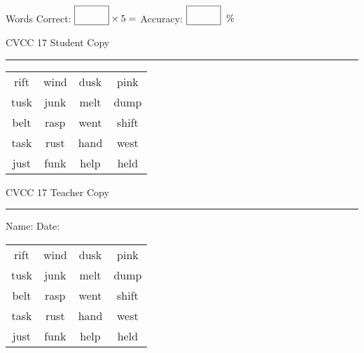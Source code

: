 \documentclass{memoir}
\begin{document}
\small

Words Correct: $\fbox{\phantom{\huge 100}} \times 5 = $ Accuracy: $\fbox{\phantom{\huge 100}}\;\; \%$ 

\vfill

\newpage


\footnotesize \noindent
CVCC 17 \hfill Student Copy
\smallskip
\hrule

\Large

\setlength{\tabcolsep}{14pt}
\def\arraystretch{3}

{\selectfont


\begin{vplace}[0.5]
\begin{center}
\begin{tabular}{cccc}
rift & wind & dusk & pink \\
tusk & junk & melt & dump \\
belt & rasp & went & shift \\
task & rust & hand & west \\
just & funk & help & held \\
\end{tabular}
\end{center}
\end{vplace}

}

\newpage

\footnotesize \noindent
CVCC 17 \hfill Teacher Copy
\smallskip
\hrule

\small

\vfill

\noindent
Name: \underline{\hspace{1.75in}} \hfill Date: \underline{\hspace{1in}}

\Large

{\selectfont


\begin{vplace}[0.5]
\begin{center}
\begin{tabular}{cccc}
rift & wind & dusk & pink \\
tusk & junk & melt & dump \\
belt & rasp & went & shift \\
task & rust & hand & west \\
just & funk & help & held \\
\end{tabular}
\end{center}
\end{vplace}



}
\end{document}
